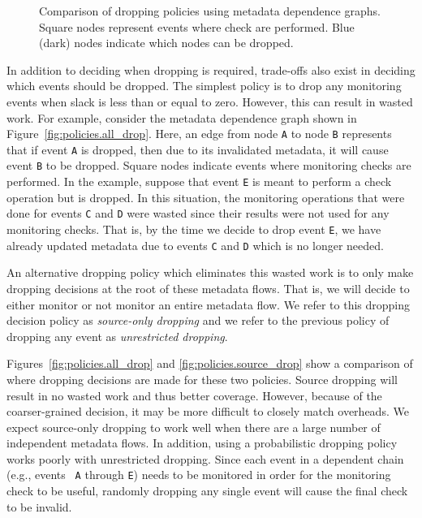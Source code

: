 \begin{figure}
\begin{center}
{    \label{fig:policies.source_drop}
  }
  \vspace{-0.1in}
  \end{center}
  \vspace{-0.1in}
  \caption{Comparison of dropping policies using metadata dependence graphs.
  Square nodes represent events where check are performed. Blue (dark) nodes
  indicate which nodes can be dropped.}
  \label{fig:policies.policies}
\end{figure}

In addition to deciding when dropping is required, trade-offs also exist in
deciding which events should be dropped.
The simplest policy is to drop any monitoring events when slack is less than or equal to zero.  However, this can result in
wasted work. For example, consider the metadata dependence graph shown in
Figure~\ref{fig:policies.all_drop}. Here, an edge from node {\tt A} to node
{\tt B} represents that if event {\tt A} is dropped, then due to its
invalidated metadata, it will cause event {\tt B} to be dropped. Square
nodes indicate events where monitoring checks are performed. In the
example, suppose that event {\tt E} is meant to perform a check operation but is dropped.
In this situation, the
monitoring operations that were done for events {\tt C} and {\tt D} were wasted
since their results were not used for any monitoring checks.
That is, by the time we decide to drop event {\tt E}, we have already 
updated metadata due to events {\tt C} and {\tt D} which is no longer needed.

An alternative dropping policy which eliminates this wasted work is to only make dropping decisions at
the root of these metadata flows. That is, we will decide to either monitor or
not monitor an entire metadata flow. We refer to this dropping decision policy
as \emph{source-only dropping} and we refer to the previous policy of 
dropping any event as \emph{unrestricted dropping}.

Figures~\ref{fig:policies.all_drop} and \ref{fig:policies.source_drop} show a
comparison of where dropping decisions are made for these two policies. Source
dropping will
result in no wasted work and thus better coverage. However, because of the coarser-grained decision, it
may be more difficult to closely match overheads. We expect source-only dropping 
to work well when there are a large number of independent metadata flows.
In addition, using a probabilistic dropping policy works poorly with
unrestricted dropping. Since each event in a dependent chain (e.g., events {\tt
A} through {\tt E}) needs to be monitored in order for the monitoring check to
be useful, randomly dropping any single event will cause the final check to be
invalid.

